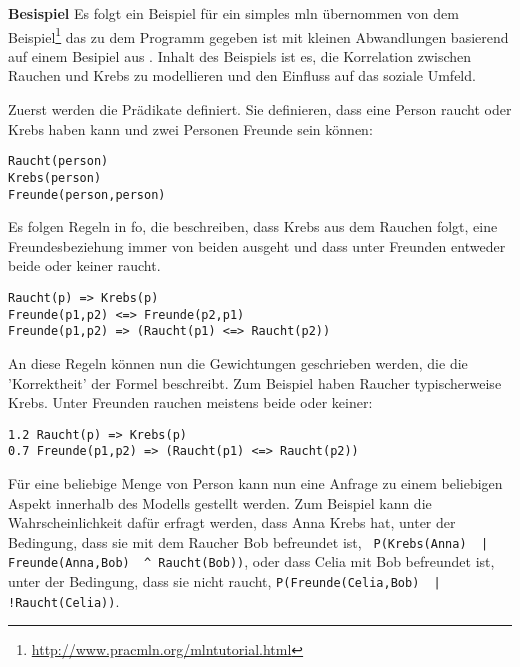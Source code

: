 \textbf{Besispiel}\label{mlnexample} Es folgt ein Beispiel für ein simples \gls{mln} übernommen von dem Beispiel\footnote{\url{http://www.pracmln.org/mlntutorial.html}} das zu dem Programm \pracmln gegeben ist mit kleinen Abwandlungen basierend auf einem Besipiel aus \cite{nyga17}. Inhalt des Beispiels ist es, die Korrelation zwischen Rauchen und Krebs zu modellieren und den Einfluss auf das soziale Umfeld. \par
Zuerst werden die Prädikate definiert. Sie definieren, dass eine Person raucht oder Krebs haben kann und zwei Personen Freunde sein können:
\begin{lstlisting}[backgroundcolor=\color{backcolour}]
Raucht(person)
Krebs(person)
Freunde(person,person)
\end{lstlisting}
Es folgen Regeln in \gls{fo}, die beschreiben, dass Krebs aus dem Rauchen folgt, eine Freundesbeziehung immer von beiden ausgeht und dass unter Freunden entweder beide oder keiner raucht. 
\begin{lstlisting}[backgroundcolor=\color{backcolour}]
Raucht(p) => Krebs(p)
Freunde(p1,p2) <=> Freunde(p2,p1)
Freunde(p1,p2) => (Raucht(p1) <=> Raucht(p2))
\end{lstlisting}
An diese Regeln können nun die Gewichtungen geschrieben werden, die die 'Korrektheit' der Formel beschreibt. Zum Beispiel haben Raucher typischerweise Krebs. Unter Freunden rauchen meistens beide oder keiner:
\begin{lstlisting}[backgroundcolor=\color{backcolour}]
1.2 Raucht(p) => Krebs(p)
0.7 Freunde(p1,p2) => (Raucht(p1) <=> Raucht(p2))
\end{lstlisting}  
Für eine beliebige Menge von Person kann nun eine Anfrage zu einem beliebigen Aspekt innerhalb des Modells  gestellt werden. Zum Beispiel kann die Wahrscheinlichkeit dafür erfragt werden, dass Anna Krebs hat, unter der Bedingung, dass sie mit dem Raucher Bob befreundet ist, \lstinline[breaklines=true]{ P(Krebs(Anna)  | Freunde(Anna,Bob)  ^ Raucht(Bob))}, oder dass Celia mit Bob befreundet ist, unter der Bedingung, dass sie nicht raucht, \lstinline[breaklines=true]{P(Freunde(Celia,Bob)  | !Raucht(Celia))}.


